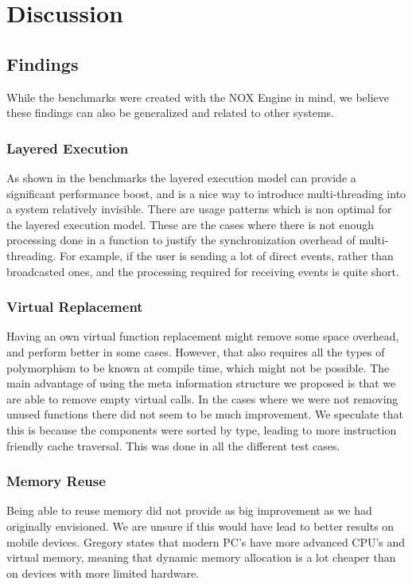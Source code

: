 \chapter{Discussion}
\label{chap:discussion}

\section{Findings}
While the benchmarks were created with the NOX Engine in mind,
we believe these findings can also be generalized and related to other systems.

\subsection{Layered Execution}
As shown in the benchmarks the layered execution model can provide a significant performance boost,
and is a nice way to introduce multi-threading into a system relatively invisible.
There are usage patterns which is non optimal for the layered execution model.
These are the cases where there is not enough processing done in a function to justify the synchronization overhead
of multi-threading.
For example, if the user is sending a lot of direct events, rather than broadcasted ones,
and the processing required for receiving events is quite short.

\subsection{Virtual Replacement}
Having an own virtual function replacement might remove some space overhead, and perform better in some cases.
However, that also requires all the types of polymorphism to be known at compile time, which might
not be possible.
The main advantage of using the meta information structure we proposed is that we are able to remove empty
virtual calls.
In the cases where we were not removing unused functions there did not seem to be much improvement.
We speculate that this is because the components were sorted by type, leading to more instruction friendly
cache traversal. This was done in all the different test cases.

\subsection{Memory Reuse}
Being able to reuse memory did not provide as big improvement as we had originally envisioned.
We are unsure if this would have lead to better results on mobile devices.
Gregory\cite[p.262]{game_engine_architecture} states that modern PC's have more advanced CPU's and virtual
memory, meaning that dynamic memory allocation is a lot cheaper than on devices with more limited hardware.

